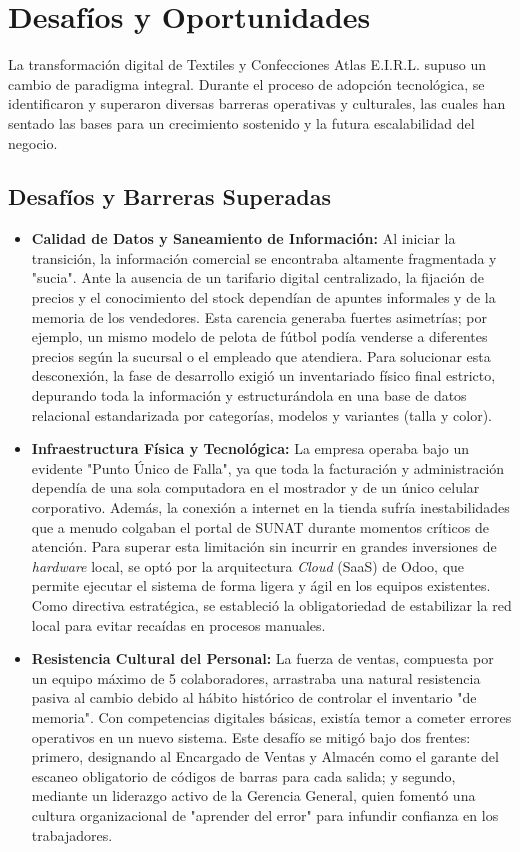 \section{Desafíos y Oportunidades}

La transformación digital de Textiles y Confecciones Atlas E.I.R.L. supuso un cambio de paradigma integral. Durante el proceso de adopción tecnológica, se identificaron y superaron diversas barreras operativas y culturales, las cuales han sentado las bases para un crecimiento sostenido y la futura escalabilidad del negocio.

\subsection{Desafíos y Barreras Superadas}

\begin{itemize}
    \item \textbf{Calidad de Datos y Saneamiento de Información:} Al iniciar la transición, la información comercial se encontraba altamente fragmentada y "sucia". Ante la ausencia de un tarifario digital centralizado, la fijación de precios y el conocimiento del stock dependían de apuntes informales y de la memoria de los vendedores. Esta carencia generaba fuertes asimetrías; por ejemplo, un mismo modelo de pelota de fútbol podía venderse a diferentes precios según la sucursal o el empleado que atendiera. Para solucionar esta desconexión, la fase de desarrollo exigió un inventariado físico final estricto, depurando toda la información y estructurándola en una base de datos relacional estandarizada por categorías, modelos y variantes (talla y color).
    \item \textbf{Infraestructura Física y Tecnológica:} La empresa operaba bajo un evidente "Punto Único de Falla", ya que toda la facturación y administración dependía de una sola computadora en el mostrador y de un único celular corporativo. Además, la conexión a internet en la tienda sufría inestabilidades que a menudo colgaban el portal de SUNAT durante momentos críticos de atención. Para superar esta limitación sin incurrir en grandes inversiones de \textit{hardware} local, se optó por la arquitectura \textit{Cloud} (SaaS) de Odoo, que permite ejecutar el sistema de forma ligera y ágil en los equipos existentes. Como directiva estratégica, se estableció la obligatoriedad de estabilizar la red local para evitar recaídas en procesos manuales.
    \item \textbf{Resistencia Cultural del Personal:} La fuerza de ventas, compuesta por un equipo máximo de 5 colaboradores, arrastraba una natural resistencia pasiva al cambio debido al hábito histórico de controlar el inventario "de memoria". Con competencias digitales básicas, existía temor a cometer errores operativos en un nuevo sistema. Este desafío se mitigó bajo dos frentes: primero, designando al Encargado de Ventas y Almacén como el garante del escaneo obligatorio de códigos de barras para cada salida; y segundo, mediante un liderazgo activo de la Gerencia General, quien fomentó una cultura organizacional de "aprender del error" para infundir confianza en los trabajadores.
\end{itemize}


